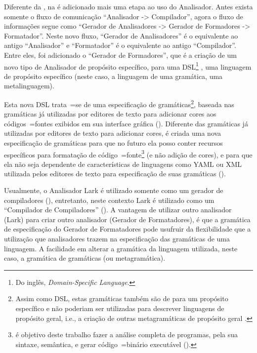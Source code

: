 Diferente da ,
na  é adicionado mais uma etapa ao uso do Analisador.
Antes exista somente o fluxo de comunicação ``Analisador -> Compilador'',
agora o fluxo de informações segue como ``Gerador de Analisadores -> Gerador de Formadores -> Formatador''.
Neste novo fluxo,
``Gerador de Analisadores'' é o equivalente ao antigo ``Analisador'' e
``Formatador'' é o equivalente ao antigo ``Compilador''.
Entre eles,
foi adicionado o ``Gerador de Formadores'',
que é a criação de um novo tipo de Analisador de propósito específico,
para uma DSL\footnote{%
Do inglês,
\textit{Domain-Specific Language}.
} \cite{areThereDomainSpecificLanguages,yamlSpecificModelChecking},
uma linguagem de propósito específico (neste caso,
a linguagem de uma gramática,
uma metalinguagem).

Esta nova DSL trata~=se de uma especificação de gramáticas\footnote{
Assim como DSL\s,
estas gramáticas também são de para um propósito específico e
não poderiam ser utilizadas para descrever linguagens de propósito geral,
i.e.,
a criação de outras metagramáticas de propósito geral \cite{turingCompleteRegularLanguages}.
},
baseada nas gramáticas já utilizadas por editores de texto para adicionar cores aos códigos~=fontes exibidos em sua interface gráfica ().
Diferente das gramáticas já utilizadas por editores de texto para adicionar cores,
é criada uma nova especificação de gramáticas para que no futuro ela posso conter recursos específicos para formatação de código~=fonte\footnote{
 é objetivo deste trabalho fazer a análise completa de programas,
pela sua sintaxe, semântica,
e gerar código~=binário executável ().
}
(e não adição de cores),
e para que ela não seja dependente de características de linguagens como YAML ou
XML utilizada pelos editores de texto para especificação de suas gramáticas ().

Usualmente,
o Analisador Lark é utilizado somente como um gerador de compiladores (),
entretanto,
neste contexto Lark é utilizado como um ``Compilador de Compiladores'' ().
A vantagem de utilizar outro analisador (Lark) para criar outro analisador (Gerador de Formatadores),
é que a gramática de especificação do Gerador de Formatadores pode usufruir da flexibilidade que a utilização que analisadores trazem na especificação das gramáticas de uma linguagem.
A facilidade em alterar a gramática da linguagem utilizada,
neste caso,
a gramática de gramáticas (ou metagramática).

